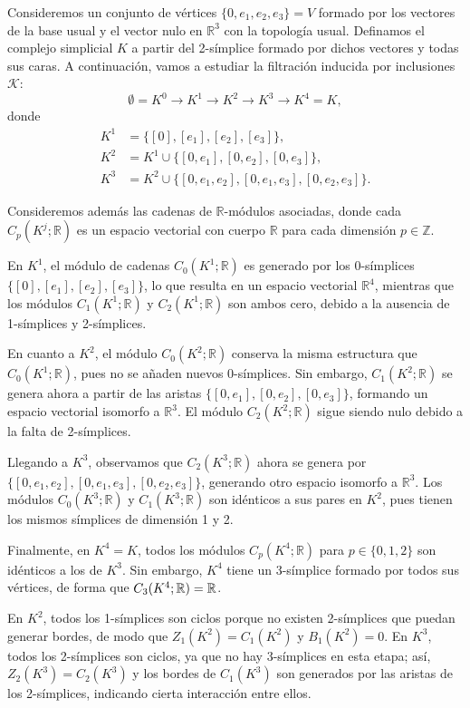 \begin{ejemplo}
	\label{ex:pers-homology}
	Consideremos un conjunto de vértices $\{0, e_1, e_2, e_3\} = V$ formado por los vectores de la base usual y el vector nulo en $\mathbb{R}^3$ con la topología usual. Definamos el complejo simplicial $K$ a partir del 2-símplice formado por dichos vectores y todas sus caras. A continuación, vamos a estudiar la filtración inducida por inclusiones $\mathcal{K}$:
	\[
	\emptyset = K^0 \to K^1 \to K^2 \to K^3 \to K^4 = K,
	\]
	donde 
	\begin{align*}
		K^1 &= \{[0], [e_1], [e_2], [e_3]\}, \\
		K^2 &= K^1 \cup \{[0, e_1], [0, e_2], [0, e_3]\}, \\
		K^3 &= K^2 \cup \{[0, e_1, e_2], [0, e_1, e_3], [0, e_2, e_3]\}.
	\end{align*}
	
	Consideremos además las cadenas de $\mathbb{R}$-módulos asociadas, donde cada $C_p(K^j;\mathbb{R})$ es un espacio vectorial con cuerpo $\mathbb{R}$ para cada dimensión $p \in \mathbb{Z}$.
	
	En $K^1$, el módulo de cadenas $C_0(K^1; \mathbb{R})$ es generado por los 0-símplices $\{ [0], [e_1], [e_2], [e_3] \}$, lo que resulta en un espacio vectorial $\mathbb{R}^4$, mientras que los módulos $C_1(K^1; \mathbb{R})$ y $C_2(K^1; \mathbb{R})$ son ambos cero, debido a la ausencia de 1-símplices y 2-símplices.
	
	En cuanto a $K^2$, el módulo $C_0(K^2; \mathbb{R})$ conserva la misma estructura que $C_0(K^1; \mathbb{R})$, pues no se añaden nuevos 0-símplices. Sin embargo, $C_1(K^2; \mathbb{R})$ se genera ahora a partir de las aristas $\{ [0, e_1], [0, e_2], [0, e_3] \}$, formando un espacio vectorial isomorfo a $\mathbb{R}^3$. El módulo $C_2(K^2; \mathbb{R})$ sigue siendo nulo debido a la falta de 2-símplices.
	
	Llegando a $K^3$, observamos que $C_2(K^3; \mathbb{R})$ ahora se genera por $\{ [0, e_1, e_2], [0, e_1, e_3], [0, e_2, e_3] \}$, generando otro espacio isomorfo a $\mathbb{R}^3$. Los módulos $C_0(K^3; \mathbb{R})$ y $C_1(K^3; \mathbb{R})$ son idénticos a sus pares en $K^2$, pues tienen los mismos símplices de dimensión 1 y 2.
	
	Finalmente, en $K^4 = K$, todos los módulos $C_p(K^4; \mathbb{R})$ para $p \in \{ 0, 1, 2 \}$ son idénticos a los de $K^3$. Sin embargo, $K^4$ tiene un 3-símplice formado por todos sus vértices, de forma que $C_3(K^4; \mathbb{R}) = \mathbb{R}$.
	
	En $K^2$, todos los 1-símplices son ciclos porque no existen 2-símplices que puedan generar bordes, de modo que $Z_1(K^2) = C_1(K^2)$ y $B_1(K^2) = 0$. En $K^3$, todos los 2-símplices son ciclos, ya que no hay 3-símplices en esta etapa; así, $Z_2(K^3) = C_2(K^3)$ y los bordes de $C_1(K^3)$ son generados por las aristas de los 2-símplices, indicando cierta interacción entre ellos.
	

\end{ejemplo}
